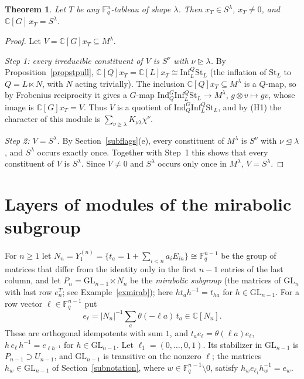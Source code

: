 \documentclass[11pt, letterpaper]{amsart}
\newtheorem{theorem}{Theorem}
\theoremstyle{definition}
\theoremstyle{remark}
\newcommand{\FF}{\mathbb{F}}
\newcommand{\CC}{\mathbb{C}}
\newcommand{\GL}{\mathrm{GL}}
\newcommand{\Ind}{\mathrm{Ind}}
\newcommand{\Inf}{\mathrm{Inf}}
\newcommand{\St}{\mathrm{St}}
\newcommand{\domeq}{\trianglelefteq}
\begin{document}
\begin{theorem}\label{thmx}
Let $T$ be any $\FF_q^n$-tableau of shape $\lambda$. Then $x_T\in S^\lambda$, $x_T\ne0$, and $\CC[G]\,x_T=S^\lambda$.
\end{theorem}

\begin{proof}
Let $V=\CC[G]x_T\subseteq M^\lambda$.

\emph{Step 1: every irreducible constituent of $V$ is $S^\nu$ with $\nu\trianglerighteq\lambda$.} By Proposition~\ref{propstpull}, $\CC[Q]x_T=\CC[L]x_T\cong\Inf_L^Q\St_L$ (the inflation of $\St_L$ to $Q=L\ltimes N$, with $N$ acting trivially). The inclusion $\CC[Q]x_T\subseteq M^\lambda$ is a $Q$-map, so by Frobenius reciprocity it gives a $G$-map $\Ind_Q^G\Inf_L^Q\St_L\to M^\lambda$, $g\otimes v\mapsto gv$, whose image is $\CC[G]x_T=V$. Thus $V$ is a quotient of $\Ind_Q^G\Inf_L^Q\St_L$, and by (H1) the character of this module is $\sum_{\nu\trianglerighteq\lambda}K_{\nu\lambda}\chi^\nu$.

\emph{Step 2: $V=S^\lambda$.} By Section~\ref{subflags}(e), every constituent of $M^\lambda$ is $S^\nu$ with $\nu\domeq\lambda$, and $S^\lambda$ occurs exactly once. Together with Step~1 this shows that every constituent of $V$ is $S^\lambda$. Since $V\ne0$ and $S^\lambda$ occurs only once in $M^\lambda$, $V=S^\lambda$.
\end{proof}

\section{Layers of modules of the mirabolic subgroup}\label{seclayers}

For $n\ge1$ let $N_n=Y^{(n)}_1=\{t_a=1+\sum_{i<n}a_iE_{in}\}\cong\FF_q^{n-1}$ be the group of matrices that differ from the identity only in the first $n-1$ entries of the last column, and let $P_n=\GL_{n-1}\ltimes N_n$ be the \emph{mirabolic subgroup} (the matrices of $\GL_n$ with last row $e_n^T$; see Example~\ref{exmirab}); here $ht_ah^{-1}=t_{ha}$ for $h\in\GL_{n-1}$. For a row vector $\ell\in\FF_q^{n-1}$ put
\[
e_\ell=|N_n|^{-1}\sum_{a}\theta(-\ell a)\,t_a\in\CC[N_n].
\]
These are orthogonal idempotents with sum $1$, and $t_ae_\ell=\theta(\ell a)e_\ell$, $h\,e_\ell\,h^{-1}=e_{\ell h^{-1}}$ for $h\in\GL_{n-1}$. Let $\ell_1=(0,\dots,0,1)$. Its stabilizer in $\GL_{n-1}$ is $P_{n-1}\supset U_{n-1}$, and $\GL_{n-1}$ is transitive on the nonzero $\ell$; the matrices $h_w\in\GL_{n-1}$ of Section~\ref{subnotation}, where $w\in\FF_q^{n-1}\setminus0$, satisfy $h_we_{\ell_1}h_w^{-1}=e_w$.
\end{document}
